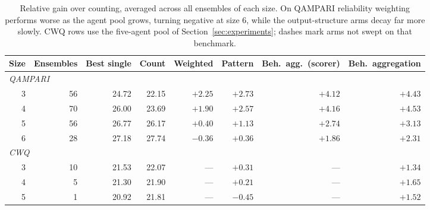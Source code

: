 \documentclass{article}
\begin{document}
\begin{table}[H]
  \caption{Relative gain over counting, averaged across all ensembles of each size. On QAMPARI reliability weighting performs worse as the agent pool grows, turning negative at size 6, while the output-structure arms decay far more slowly. CWQ rows use the five-agent pool of Section~\ref{sec:experiments}; dashes mark arms not swept on that benchmark.}
  \label{tab:ens-gain}
  \centering
  \begin{tabular}{rrrrrrrr}
    \toprule
    Size & Ensembles & Best single & Count & Weighted & Pattern & Beh.\ agg.\ (scorer) & Beh.\ aggregation \\
    \midrule
    \multicolumn{8}{l}{\emph{QAMPARI}} \\
    3 & 56 & 24.72 & 22.15 & $+2.25$ & $+2.73$ & $+4.12$ & $\mathbf{+4.43}$ \\
    4 & 70 & 26.00 & 23.69 & $+1.90$ & $+2.57$ & $+4.16$ & $\mathbf{+4.53}$ \\
    5 & 56 & 26.77 & 26.17 & $+0.40$ & $+1.13$ & $+2.74$ & $\mathbf{+3.13}$ \\
    6 & 28 & 27.18 & 27.74 & $-0.36$ & $+0.36$ & $+1.86$ & $\mathbf{+2.31}$ \\
    \midrule
    \multicolumn{8}{l}{\emph{CWQ}} \\
    3 & 10 & 21.53 & 22.07 & --- & $+0.31$ & --- & $\mathbf{+1.34}$ \\
    4 &  5 & 21.30 & 21.90 & --- & $+0.21$ & --- & $\mathbf{+1.65}$ \\
    5 &  1 & 20.92 & 21.81 & --- & $-0.45$ & --- & $\mathbf{+1.52}$ \\
    \bottomrule
  \end{tabular}
\end{table}
\end{document}
